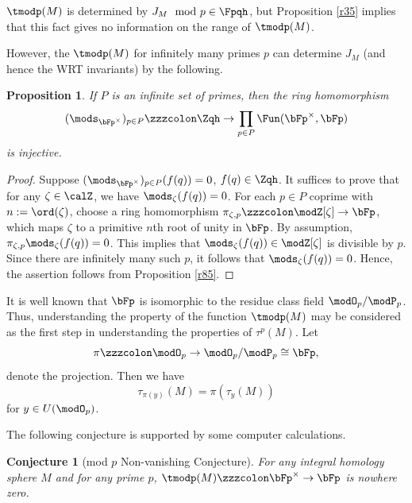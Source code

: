 \documentclass{amsart}
\numberwithin{equation}{section}
\numberwithin{figure}{section}
\theoremstyle{plain}
\newtheorem{proposition}[theorem]{Proposition}
\newtheorem{conjecture}[theorem]{Conjecture}
\theoremstyle{definition}
\theoremstyle{remark}
\begin{document}
$\tmodp(M)$ is determined by $J_M\mod p\in \Fpqh$, but Proposition
\ref{r35} implies that this fact gives no information on the range of
$\tmodp(M)$.

However, the $\tmodp(M)$ for infinitely many primes $p$ can
determine $J_M$ (and hence the WRT invariants)
by the following.

\begin{proposition}
  \label{r1}
  If $P$ is an infinite set of primes, then the ring homomorphism
  \begin{equation*}
    (\mods _{\bFp^\times })_{p\in P}
    \zzzcolon \Zqh\rightarrow \prod_{p\in P}\Fun(\bFp^\times ,\bFp)
  \end{equation*}
  is injective.
\end{proposition}

\begin{proof}
  Suppose $(\mods _{\bFp^\times })_{p\in P}(f(q))=0$, $f(q)\in \Zqh$.  It
  suffices to prove that for any $\zeta \in \calZ$, we have $\mods _\zeta (f(q))=0$.
  For each $p\in P$ coprime with $n:=\ord(\zeta )$, choose a ring
  homomorphism $\pi _{\zeta ,p}\zzzcolon \modZ [\zeta ]\rightarrow \bFp$, which maps $\zeta $ to a
  primitive $n$th root of unity in $\bFp$.  By assumption,
  $\pi _{\zeta ,p}\mods _\zeta (f(q))=0$.  This implies that $\mods _\zeta (f(q))\in \modZ [\zeta ]$ is
  divisible by $p$.  Since there are infinitely many such $p$, it
  follows that $\mods _\zeta (f(q))=0$.  Hence, the assertion follows from
  Proposition \ref{r85}.
\end{proof}

It is well known that $\bFp$ is isomorphic to the residue class
field $\modO _p/\modP _p$.  Thus, understanding the property of the function
$\tmodp(M)$ may be considered as the first step in understanding the
properties of $\tau ^p(M)$.  Let
\begin{equation*}
  \pi \zzzcolon \modO _p\rightarrow \modO _p/\modP _p\cong\bFp,
\end{equation*}
denote the projection.  Then we have
\begin{equation}
  \label{e84}
  \tau _{\pi (y)}(M)=\pi (\tau _y(M))
\end{equation}
for $y\in U(\modO _p)$.

The following conjecture is supported by some computer calculations.

\begin{conjecture}[mod $p$ Non-vanishing Conjecture]
  \label{r31}
  For any integral homology sphere $M$ and for any prime $p$,
  $\tmodp(M)\zzzcolon \bFp^\times \rightarrow \bFp$ is nowhere zero.
\end{conjecture}
\end{document}
